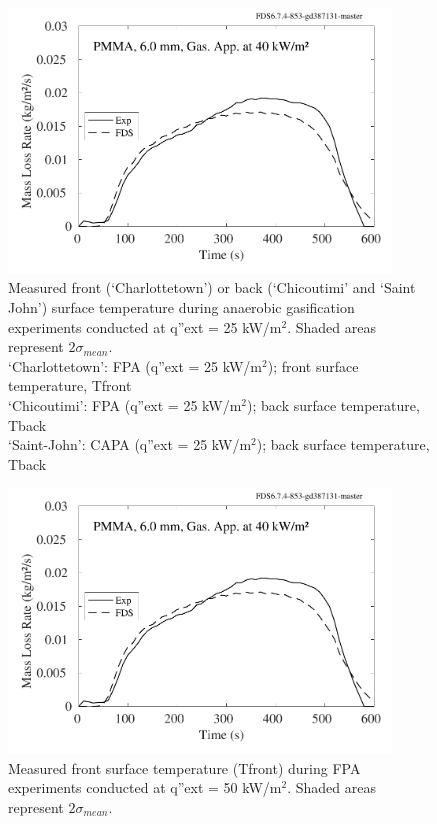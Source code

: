 \documentclass{book}
\begin{document}
\begin{figure}
  \centering
  \includegraphics[width=4in]{SCRIPT_FIGURES/PMMA_40}
  \caption{Measured front (‘Charlottetown’) or back (‘Chicoutimi’ and ‘Saint John’) surface temperature during anaerobic gasification experiments conducted at q”ext = 25 kW/m$^2$. Shaded areas represent $2\sigma_{mean}$. \\
‘Charlottetown’:  FPA (q”ext = 25 kW/m$^2$); front surface temperature, Tfront \\
‘Chicoutimi’:   FPA (q”ext = 25 kW/m$^2$); back surface temperature, Tback \\
‘Saint-John’:   CAPA (q”ext = 25 kW/m$^2$); back surface temperature, Tback}
  \label{Fig_26}
\end{figure}

\begin{figure}
  \centering
  \includegraphics[width=4in]{SCRIPT_FIGURES/PMMA_40}
  \caption{Measured front surface temperature (Tfront) during FPA experiments conducted at q”ext = 50 kW/m$^2$. Shaded areas represent $2\sigma_{mean}$.}
  \label{Fig_27}
\end{figure}
\end{document}
